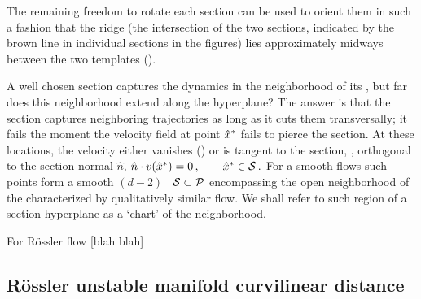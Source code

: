 The remaining freedom
to rotate each section can be used to orient them in such a fashion that
the ridge
(the intersection of the two sections, indicated by the brown line in
individual sections in the figures) lies approximately midways between the
two templates ().

A well chosen section captures the dynamics in the neighborhood of its
\template, but far does this neighborhood extend along the hyperplane?
The answer is that the section captures neighboring trajectories as long
as it cuts them transversally; it fails the moment the velocity field at
point $\hat{x}^\ast$ fails to pierce the section. At these locations, the
velocity either vanishes (\eqv) or is tangent to the section, \ie,
orthogonal to the section normal $\hat{n}$,
\(
    \hat{n} \cdot v(\hat{x}^\ast) = 0
\,,\qquad
    \hat{x}^\ast \in \cal{S}
\,.
\) %
For a smooth flows such points form a smooth $(d\!-\!2)$\dmn\ \emph{\poincBord} ${\cal S} \subset {\cal P}$
encompassing the open neighborhood of the {\template} characterized by
qualitatively similar flow. We shall refer to such region of a section hyperplane
as a `chart' of the {\template} neighborhood.


For R\"ossler flow 
[blah blah]

\subsection{R\"ossler unstable manifold curvilinear distance}
